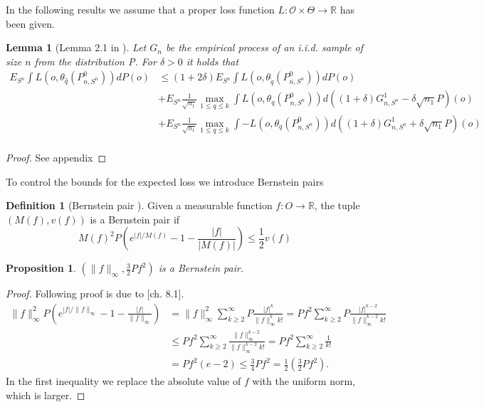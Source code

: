 \documentclass[11pt, a4paper]{article}
\newcommand\norm[1]{\lVert#1\rVert}
\newtheorem{proposition}[theorem]{Proposition}
\newtheorem{lemma}[theorem]{Lemma}
\theoremstyle{definition}
\newtheorem{definition}[theorem]{Definition}
\theoremstyle{remark}
\newcommand{\q}{q}
\newcommand{\btheta}{\theta}
\newcommand{\Sn}{S^n}
\begin{document}
In the following results we assume that a proper loss function $ L: \mathcal{O} \times \Theta \to \mathbb{R} $ has been given.  
\begin{lemma}[Lemma 2.1 in \parencite{vaart06}] \label{finitesampledecomp}
    Let $ G_{n} $ be the empirical process of an i.i.d. sample of size $ n $ from the distribution P. For $ \delta > 0 $ it holds that
   \begin{align*}
       E_{\Sn} \int L(o, \btheta_{ \hat{\q}}(P_{n, \Sn}^{0})) dP(o) &\leq (1 + 2 \delta) E_{\Sn} \int L(o, \btheta_{ \tilde{\q} }(P_{n, \Sn}^{0})) d P(o) \\ 
                                                                &+E_{\Sn} \frac{1}{\sqrt{n_1} } \max_{1 \leq \q \leq k} \int L(o, \btheta_{\q}(P_{n, \Sn}^{0})) d ((1 + \delta) G_{n,\Sn}^{1} - \delta \sqrt{n_1} P)(o)  \\
                                                                &+E_{\Sn} \frac{1}{\sqrt{n_1} } \max_{1 \leq \q \leq k} \int-L(o, \btheta_{\q}(P_{n, \Sn}^{0})) d ((1 + \delta) G_{n,\Sn}^{1} + \delta \sqrt{n_1} P)(o)  \\
   \end{align*}
\end{lemma}
\begin{proof}
    See appendix
\end{proof}
To control the bounds for the expected loss we introduce Bernstein pairs 
\begin{definition}[Bernstein pair \parencite{vaart06}]
    Given a measurable function $ f: O \to \mathbb{R} $, the tuple $ (M(f) , v(f)) $ is a Bernstein pair if 
    \begin{equation} \label{bernstein}
        M(f)^2 P\left( e^{|f|/M(f)} -1 - \frac{|f|}{|M(f)|}\right) \leq \frac{1}{2}v(f) 
    \end{equation}
\end{definition}
\begin{proposition} \label{unifbernstein}
    $ (\norm{f}_{\infty}, \frac{3}{2} Pf^2 ) $ is a Bernstein pair. 
\end{proposition}
\begin{proof}
    Following proof is due to \parencite{vaart06}[ch. 8.1]. 
    \begin{align*}
        \norm{f}_{\infty}^2 P\left( e^{|f|/\norm{f}_{\infty}} -1 - \frac{|f|}{\norm{f}_{\infty}}\right) &= \norm{f}_{\infty}^{2} \sum_{k \geq 2}^{\infty} P \frac{|f|^{k}}{\norm{f}^{k}_{\infty}k!} = Pf^2 \sum_{k \geq 2}^{\infty} P\frac{|f|^{k-2}}{\norm{f}^{k-2}_{\infty} k! } \\
                                                                                                        &\leq P f^2 \sum_{k \geq 2}^{\infty} \frac{\norm{f}_{\infty}^{k-2}}{\norm{f}^{k-2}_{\infty} k! } = P f^2 \sum_{k \geq 2}^{\infty} \frac{1}{k !}\\
                                                                                                        &= P f^2 (e-2)\leq \frac{3}{4} P f^2 = \frac{1}{2} \left(\frac{3}{2} Pf^2\right). 
    \end{align*}
   In the first inequality we replace the absolute value of $ f $ with the uniform norm, which is larger. 
\end{proof}
\end{document}
